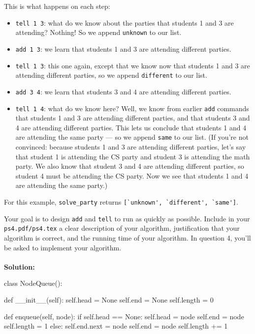 \documentclass{assignment-263}
\begin{document}
\begin{enumerate}
This is what happens on each step:
\begin{itemize}
\item \verb|tell 1 3|: what do we know about the parties that students 1 and 3 are attending? Nothing! So we append \verb|unknown| to our list.
\item \verb|add 1 3|: we learn that students 1 and 3 are attending different parties.
\item \verb|tell 1 3|: this one again, except that we know now that students 1 and 3 are attending different parties, so we append \verb|different| to our list.
\item \verb|add 3 4|: we learn that students 3 and 4 are attending different parties.
\item \verb|tell 1 4|: what do we know here? Well, we know from earlier \verb|add| commands that students 1 and 3 are attending different parties, and that students 3 and 4 are attending different parties. This lets us conclude that students 1 and 4 are attending the same party --- so we append \verb|same| to our list.
(If you're not convinced: because students 1 and 3 are attending different parties, let's say that student 1 is attending the CS party and student 3 is attending the math party. We also know that student 3 and 4 are attending different parties, so student 4 must be attending the CS party. Now we see that students 1 and 4 are attending the same party.)
\end{itemize}

For this example, \verb|solve_party| returns \verb|[`unknown', `different', `same']|.
    
		Your goal is to design \verb|add| and \verb|tell| to run as quickly as possible. Include in your \verb|ps4.pdf/ps4.tex| a clear description of your algorithm, justification that your algorithm is correct, and the running time of your algorithm. 
		In question 4, you'll be asked to implement your algorithm.\\
		\\
{\bf Solution:} \\ 
\begin{python}
class NodeQueue():
      
      def __init__(self):
            self.head = None
            self.end = None
            self.length = 0
            
            
            
      def enqueue(self, node):
            if self.head == None:
                  self.head = node
                  self.end = node
                  self.length = 1
            else:
                  self.end.next = node
                  self.end = node
                  self.length += 1
      

\end{python}
\end{enumerate}
\end{document}
